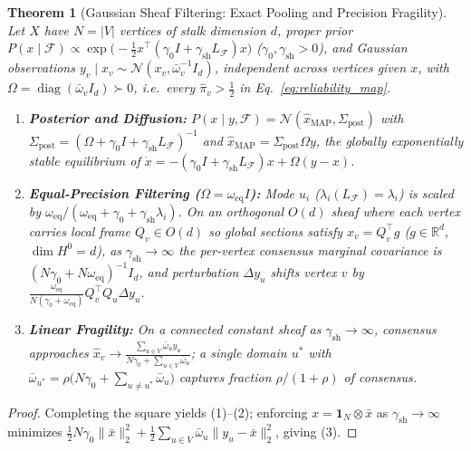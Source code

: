 \documentclass[11pt,a4paper]{article}
\newtheorem{theorem}{Theorem}
\theoremstyle{definition}
\theoremstyle{remark}
\newcommand{\R}{\mathbb{R}}
\newcommand{\diag}{\operatorname{diag}}
\begin{document}
\begin{theorem}[Gaussian Sheaf Filtering: Exact Pooling and Precision Fragility]
\label{thm:spectral}
Let $X$ have $N = |V|$ vertices of stalk dimension $d$, proper prior $P(x \mid \mathcal{F}) \propto \exp\bigl(-\frac{1}{2} x^\top (\gamma_0 I + \gamma_{\mathrm{sh}} L_{\mathcal{F}}) x\bigr)$ ($\gamma_0, \gamma_{\mathrm{sh}} > 0$), and Gaussian observations $y_v \mid x_v \sim \mathcal{N}(x_v, \bar{\omega}_v^{-1} I_d)$, independent across vertices given $x$, with $\Omega = \diag(\bar{\omega}_v I_d) \succ 0$, i.e.\ every $\hat{\pi}_v > \tfrac{1}{2}$ in Eq.~\eqref{eq:reliability_map}.
\begin{enumerate}[leftmargin=1.8em]
  \item \textbf{Posterior and Diffusion:} $P(x \mid y, \mathcal{F}) = \mathcal{N}(\hat{x}_{\mathrm{MAP}}, \Sigma_{\mathrm{post}})$ with $\Sigma_{\mathrm{post}} = (\Omega + \gamma_0 I + \gamma_{\mathrm{sh}} L_{\mathcal{F}})^{-1}$ and $\hat{x}_{\mathrm{MAP}} = \Sigma_{\mathrm{post}} \Omega y$, the globally exponentially stable equilibrium of $\dot{x} = -(\gamma_0 I + \gamma_{\mathrm{sh}} L_{\mathcal{F}})x + \Omega(y - x)$.
  \item \textbf{Equal-Precision Filtering ($\Omega = \omega_{\mathrm{eq}} I$):} Mode $u_i$ ($\lambda_i(L_{\mathcal{F}}) = \lambda_i$) is scaled by $\omega_{\mathrm{eq}} / (\omega_{\mathrm{eq}} + \gamma_0 + \gamma_{\mathrm{sh}}\lambda_i)$. On an orthogonal $O(d)$ sheaf where each vertex carries local frame $Q_v \in O(d)$ so global sections satisfy $x_v = Q_v^\top g$ ($g \in \R^d$, $\dim H^0 = d$), as $\gamma_{\mathrm{sh}} \to \infty$ the per-vertex consensus marginal covariance is $(N\gamma_0 + N\omega_{\mathrm{eq}})^{-1} I_d$, and perturbation $\Delta y_u$ shifts vertex $v$ by $\frac{\omega_{\mathrm{eq}}}{N(\gamma_0 + \omega_{\mathrm{eq}})} Q_v^\top Q_u \Delta y_u$.
  \item \textbf{Linear Fragility:} On a connected constant sheaf as $\gamma_{\mathrm{sh}} \to \infty$, consensus approaches $\hat{x}_v \to \frac{\sum_{u \in V} \bar{\omega}_u y_u}{N\gamma_0 + \sum_{u \in V} \bar{\omega}_u}$; a single domain $u^*$ with $\bar{\omega}_{u^*} = \rho \bigl(N\gamma_0 + \sum_{u \ne u^*} \bar{\omega}_u\bigr)$ captures fraction $\rho / (1 + \rho)$ of consensus.
\end{enumerate}
\end{theorem}

\begin{proof}
Completing the square yields (1)--(2); enforcing $x = \mathbf{1}_N \otimes \bar{x}$ as $\gamma_{\mathrm{sh}} \to \infty$ minimizes $\frac{1}{2} N\gamma_0 \|\bar{x}\|_2^2 + \frac{1}{2} \sum_{u \in V} \bar{\omega}_u \|y_u - \bar{x}\|_2^2$, giving (3).
\end{proof}
\end{document}
